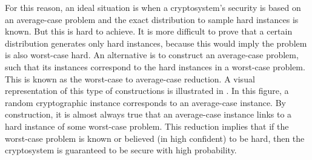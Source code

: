 \documentclass[../main.tex]{subfiles}
\begin{document}
For this reason, an ideal situation is when a cryptosystem's security is based on an average-case problem and the exact distribution to sample hard instances is known. But this is hard to achieve. It is more difficult to prove that a certain distribution generates only hard instances, because this would imply the problem is also worst-case hard. An alternative is to construct an average-case problem, such that its instances correspond to the hard instances in a worst-case problem. This is known as the worst-case to average-case reduction. A visual representation of this type of constructions is illustrated in . In this figure, a random cryptographic instance corresponds to an average-case instance. By construction, it is almost always true that an average-case instance links to a hard instance of some worst-case problem. This reduction implies that if the worst-case problem is known or believed (in high confident) to be hard, then the cryptosystem is guaranteed to be secure with high probability.  
\end{document}
